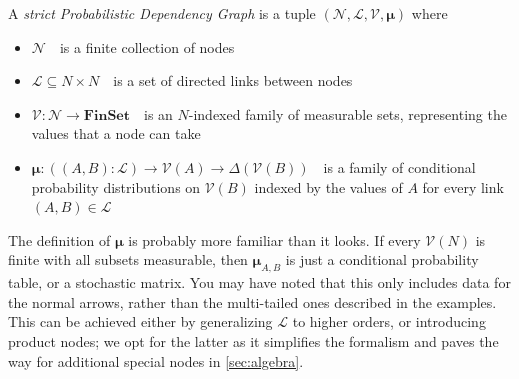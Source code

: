 \documentclass{article}
\newcommand\changed[1]{{\color{note-fg} #1}}
\newcommand\changeoff{\color{black} }
\newcommand{\modelname}{Probabilistic Dependency Graph}
\newcommand\bmu{\boldsymbol{\mu}}
\begin{document}
	\changeoff

	\begin{defn}\label{def:model}
		A \emph{strict \modelname} is a tuple $(\mathcal N, \mathcal L, \mathcal V, \bmu)$ where
		\begin{itemize}[nosep]
			\item $\mathcal N$~~is a finite collection of nodes
			\item $\mathcal L \subseteq N \times N$~~is a set of directed links between nodes
			\item $\mathcal V : \mathcal N \to \mathbf{FinSet} $~~is an $N$-indexed family of measurable sets, representing the values that a node can take
			\item $\bmu: ((A,B): \mathcal L) \to \mathcal V(A) \to \Delta(\mathcal{V}(B))$~~is a family of conditional probability distributions on $\mathcal V(B)$ indexed by the values of $A$ for every link $(A,B) \in \mathcal L$ %
		\end{itemize}
	\end{defn}

	The definition of $\bmu$ is probably more familiar than it looks. If every $\mathcal V(N)$ is finite with all subsets measurable, then $\bmu_{A,B}$ is just a conditional probability table, or a stochastic matrix.
	\changed{
	You may have noted that this only includes data for the normal arrows, rather than the multi-tailed ones described in the examples. This can be achieved either by generalizing $\mathcal L$ to higher orders, or introducing product nodes; we opt for the latter as it simplifies the formalism and paves the way for additional special nodes in \cref{sec:algebra}.
	}
\end{document}
